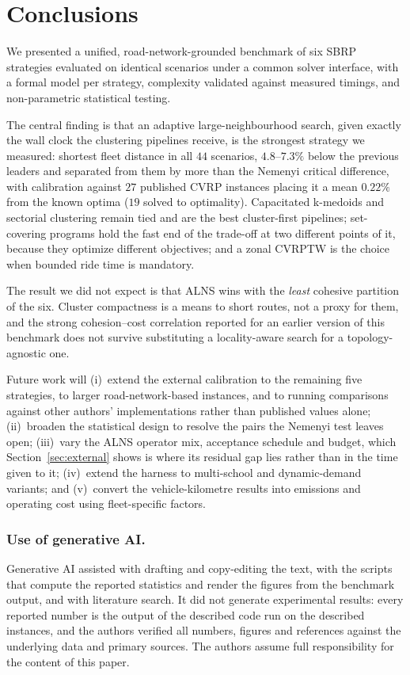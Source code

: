 \documentclass[graybox]{SNmult}
\begin{document}
\section{Conclusions}\label{sec:conclusions}
We presented a unified, road-network-grounded benchmark of six SBRP
strategies evaluated on identical scenarios under a common solver
interface, with a formal model per strategy, complexity validated against
measured timings, and non-parametric statistical testing.

The central finding is that an adaptive large-neighbourhood search,
given exactly the wall clock the clustering pipelines receive, is the
strongest strategy we measured: shortest fleet distance in all $44$
scenarios, $4.8$--$7.3\%$ below the previous leaders and separated from
them by more than the Nemenyi critical difference, with calibration
against $27$ published CVRP instances placing it a mean $0.22\%$ from the
known optima ($19$ solved to optimality). Capacitated k-medoids and
sectorial clustering remain tied and are the best cluster-first pipelines;
set-covering programs hold the fast end of the trade-off at two different
points of it, because they optimize different objectives; and a zonal
CVRPTW is the choice when bounded ride time is mandatory.

The result we did not expect is that ALNS wins with the \emph{least}
cohesive partition of the six. Cluster compactness is a means to short
routes, not a proxy for them, and the strong cohesion--cost correlation
reported for an earlier version of this benchmark does not survive
substituting a locality-aware search for a topology-agnostic one.

Future work will (i)~extend the external calibration to the remaining five
strategies, to larger road-network-based instances, and to running
comparisons against other authors' implementations rather than published
values alone; (ii)~broaden the statistical design to resolve the pairs the
Nemenyi test leaves open; (iii)~vary the ALNS operator mix, acceptance
schedule and budget, which Section~\ref{sec:external} shows is where its
residual gap lies rather than in the time given to it; (iv)~extend the
harness to multi-school and dynamic-demand variants; and (v)~convert the
vehicle-kilometre results into emissions and operating cost using
fleet-specific factors.

\subsubsection{Use of generative AI.}
Generative AI assisted with drafting and copy-editing the text, with the
scripts that compute the reported statistics and render the figures from the
benchmark output, and with literature search. It did not generate experimental
results: every reported number is the output of the described code run on the
described instances, and the authors verified all numbers, figures and
references against the underlying data and primary sources. The authors assume
full responsibility for the content of this paper.
\end{document}
